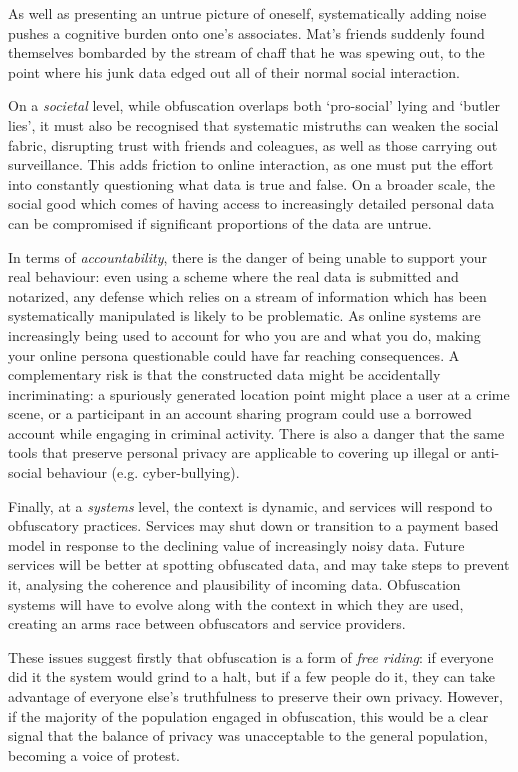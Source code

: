 \documentclass{IOS-Book-Article}     %
\begin{document}
As well as presenting an untrue picture of oneself, systematically adding noise
pushes a cognitive burden onto one's associates. Mat's friends suddenly found
themselves bombarded by the stream of chaff that he was spewing out, to the
point where his junk data edged out all of their normal social interaction.

On a \emph{societal} level, while obfuscation overlaps both `pro-social' lying
and `butler lies', it must also be recognised that systematic mistruths can weaken the social fabric,
disrupting trust with friends and coleagues, as well as those
carrying out surveillance. This adds friction to online interaction, as one must
put the effort into constantly questioning what data is true and false.
On a broader scale, the social good which comes of having access to increasingly
detailed personal data can be compromised if significant proportions of the data
are untrue. 


In terms of \emph{accountability}, there is the danger of being unable to
support your real behaviour: even using a scheme where the real data is
submitted and notarized, any defense which relies on a stream of information
which has been systematically manipulated is likely to be problematic. As online
systems are increasingly being used to account for who you are and what you do,
making your online persona questionable could have far reaching consequences. A
complementary risk is that the constructed data might be accidentally
incriminating: a spuriously generated location point might place a user at a
crime scene, or a participant in an account sharing program could use a
borrowed account while engaging in criminal activity.
There is also a danger that the same tools that preserve personal
privacy are applicable to covering up illegal or anti-social behaviour (e.g.
cyber-bullying). 

Finally, at a \emph{systems} level, the context is dynamic, and services will
respond to obfuscatory practices. 
Services may
shut down or transition to a payment based model in response to the declining
value of increasingly noisy data.
Future services will be better at spotting 
obfuscated data, and may take steps to prevent it, analysing the coherence and
plausibility of incoming data. Obfuscation systems will have to evolve along
with the context in which they are used, creating an arms race between
obfuscators and service providers.

These issues suggest firstly that obfuscation is a form of \emph{free
riding}\cite{brunton2011vernacular}: if everyone did it the system would grind
to a halt, but if a few people do it, they can take advantage of everyone else's
truthfulness to preserve their own privacy. However, if the majority of the
population engaged in obfuscation, this would be a clear signal that the balance
of privacy was unacceptable to the general population, becoming a voice of
protest.
\end{document}
